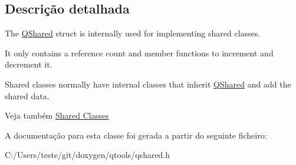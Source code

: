 \subsection{Descrição detalhada}
The \hyperlink{struct_q_shared}{Q\-Shared} struct is internally used for implementing shared classes. 

It only contains a reference count and member functions to increment and decrement it.

Shared classes normally have internal classes that inherit \hyperlink{struct_q_shared}{Q\-Shared} and add the shared data.

\begin{DoxySeeAlso}{Veja também}
\hyperlink{}{Shared Classes} 
\end{DoxySeeAlso}


A documentação para esta classe foi gerada a partir do seguinte ficheiro\-:\begin{DoxyCompactItemize}
\item 
C\-:/\-Users/teste/git/doxygen/qtools/qshared.\-h\end{DoxyCompactItemize}
